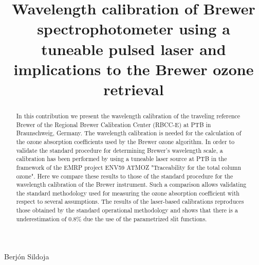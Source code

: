 \documentclass[acp, manuscript]{copernicus}
\begin{document}
\title{Wavelength calibration of Brewer spectrophotometer using a tuneable pulsed laser and implications to the Brewer ozone retrieval}


 {Berjón}
 {Sildoja}












\received{}
\pubdiscuss{} %
\revised{}
\accepted{}
\published{}




\maketitle



\begin{abstract}

In this contribution we present the wavelength calibration of the traveling reference Brewer of the Regional Brewer Calibration Center (RBCC-E)  at PTB in Braunschweig, Germany. The wavelength calibration is needed for the calculation of the ozone absorption coefficients used by the Brewer ozone algorithm. In order to validate the standard procedure for determining Brewer’s wavelength scale, a calibration has been performed by using a tuneable laser source at PTB in the framework of the EMRP project ENV59 ATMOZ "Traceability for the total column ozone". Here we compare these results to those of the standard procedure for the wavelength calibration of the Brewer instrument. Such a comparison allows validating the standard methodology used for measuring the ozone absorption coefficient with respect to several assumptions. The results of the laser-based calibrations reproduces those obtained by the standard operational methodology and shows that there is a underestimation of 0.8\%  due the use of the parametrized slit functions. 
\end{abstract}
\end{document}
